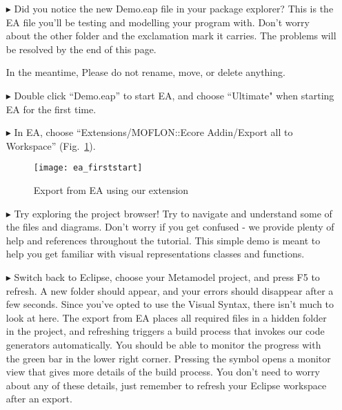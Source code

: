 \newpage
\visHeader

\begin{itemize}
\FloatBarrier
\item[$\blacktriangleright$] Did you notice the new Demo.eap file in your package explorer? This is the EA file you'll be testing and modelling your program with. Don't worry about the other folder and the exclamation mark it carries. The problems will be resolved by the end of this page.

In the meantime, Please do not rename, move, or delete anything.


\item[$\blacktriangleright$] Double click ``Demo.eap'' to start EA, and choose ``Ultimate" when starting EA for the first time.

\item[$\blacktriangleright$] In EA, choose ``Extensions/MOFLON::Ecore Addin/Export\- all\- to\- Workspace'' (Fig.~\ref{fig_ea}).

\vspace{1cm}

\begin{figure}[htbp]
	\centering
  \texttt{[image: ea\_firststart]}
	\caption{Export from EA using our extension} 
	\label{fig_ea} 
\end{figure}

\vspace{1cm}

\item[$\blacktriangleright$] Try exploring the project browser! Try to navigate and understand some of the files and diagrams. Don't worry if you get confused - we provide plenty of help and references throughout the tutorial. This simple demo is meant to help you get familiar with visual representations classes and functions.
  
\item[$\blacktriangleright$] Switch back to Eclipse, choose your Metamodel project, and press F5 to refresh. A new folder should appear, and your errors should disappear after a few seconds. Since you've opted to use the Visual Syntax, there isn't much to look at here. The export from EA places all required files in a hidden folder in the project, and refreshing triggers a build process that invokes our code generators automatically. 
You should be able to monitor the progress with the green bar in the lower right corner. Pressing the symbol opens a monitor view that gives more details of the build process. You don't need to worry about any of these details, just remember to refresh your Eclipse workspace after an export.

\end{itemize}